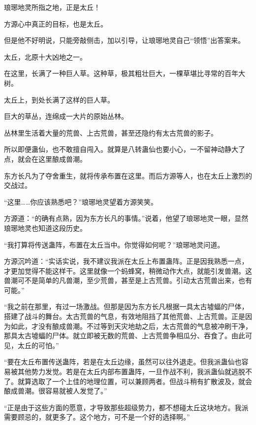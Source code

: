 
\begin{this_body}



琅琊地灵所指之地，正是太丘！

方源心中真正的目标，也是太丘。

但是他不好明说，只能旁敲侧击，加以引导，让琅琊地灵自己“领悟”出答案来。

太丘，北原十大凶地之一。

在这里，长满了一种巨人草。这种草，极其粗壮巨大，一棵草堪比寻常的百年大树。

太丘上，到处长满了这样的巨人草。

巨大的草丛，连绵成一大片的原始丛林。

丛林里生活着大量的荒兽、上古荒兽，甚至还隐约有太古荒兽的影子。

所以即便蛊仙，也不敢擅自闯入。就算是八转蛊仙也要小心，一不留神动静大了点，就会在这里酿成兽潮。

东方长凡为了夺舍重生，就将传承布置在这里。而后方源等人，也在太丘上激烈的交战过。

“这里……你应该熟悉吧？”琅琊地灵望着方源笑笑。

方源道：“的确有点熟，因为东方长凡的事情。”说着，他望了琅琊地灵一眼，显然琅琊地灵也知道这段历史。

“我打算将传送蛊阵，布置在太丘当中。你觉得如何呢？”琅琊地灵问道。

方源沉吟道：“实话实说，我不建议我派在太丘上布置蛊阵。正是因我熟悉一点，才更加觉得不能这样干。这里就像一个蚂蜂窝，稍微动作大点，就能引发兽潮。这兽潮可不是简单的凡兽潮，至少荒兽，甚至是上古荒兽。引动太古荒兽出来，也有可能。”

“我之前在那里，有过一场激战。但那是因为东方长凡根据一具太古墟蝠的尸体，搭建了战斗的舞台。太古荒兽的气息，有效地阻挡了其他荒兽、上古荒兽。正是因为如此，才没有酿成兽潮。不过等到天灾地劫之后，太古荒兽的气息被冲刷干净，那具太古墟蝠的尸体。就立即被无数的荒兽、上古荒兽争相瓜分、吞食了。由此可见，太丘的可怕。”

“要在太丘布置传送蛊阵，若是在太丘边缘，虽然可以往外退走。但我派蛊仙也容易被其他势力发觉。若是在太丘内部布置蛊阵，一旦作战不利，我派蛊仙就逃脱不了。就算选取了一个上佳的地理位置，可以兼顾两者。但战斗稍有扩散波及，就会酿成兽潮。很容易就被人发觉了。”

“正是由于这些方面的愿意，才导致那些超级势力，都不想碰太丘这块地方。我派需要顾忌的，就更多了。这个地方，可不是一个好的选择啊。”


\end{this_body}

